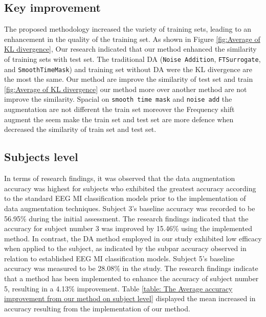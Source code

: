 \documentclass[12pt]{iopart}
\begin{document}
\subsection{Key improvement}

The proposed methodology increased the variety of training sets, leading to an enhancement in the quality of the training set. As shown in Figure \ref{fig:Average of KL divergence}, Our research indicated that our method enhanced the similarity of training sets with test set. The traditional DA (\texttt{Noise Addition}, \texttt{FTSurrogate}, and \texttt{SmoothTimeMask}) and training set without DA were the KL divergence are the most the same. 
Our method are improve the similarity of test set and train \ref{fig:Average of KL divergence} our method more over another method are not improve the similarity. Spacial on \texttt{smooth time mask} and \texttt{noise add} the augmentation are not different the train set moreover the Frequency shift augment the seem make the train set and test set are more defence when decreased  the similarity of train set and test set.


\subsection{Subjects level}

In terms of research findings, it was observed that the data augmentation accuracy was highest for subjects who exhibited the greatest accuracy according to the standard EEG MI classification models prior to the implementation of data augmentation techniques. Subject 3's baseline accuracy was recorded to be 56.95\% during the initial assessment. The research findings indicated that the accuracy for subject number 3 was improved by 15.46\% using the implemented method. In contrast, the DA method employed in our study exhibited low efficacy when applied to the subject, as indicated by the subpar accuracy observed in relation to established EEG MI classification models. 
Subject 5's baseline accuracy was measured to be 28.08\% in the study. The research findings indicate that a method has been implemented to enhance the accuracy of subject number 5, resulting in a 4.13\% improvement. Table \ref{table: The Average accuracy improvement from our method on subject level} displayed the mean increased in accuracy resulting from the implementation of our method.
 
\end{document}
